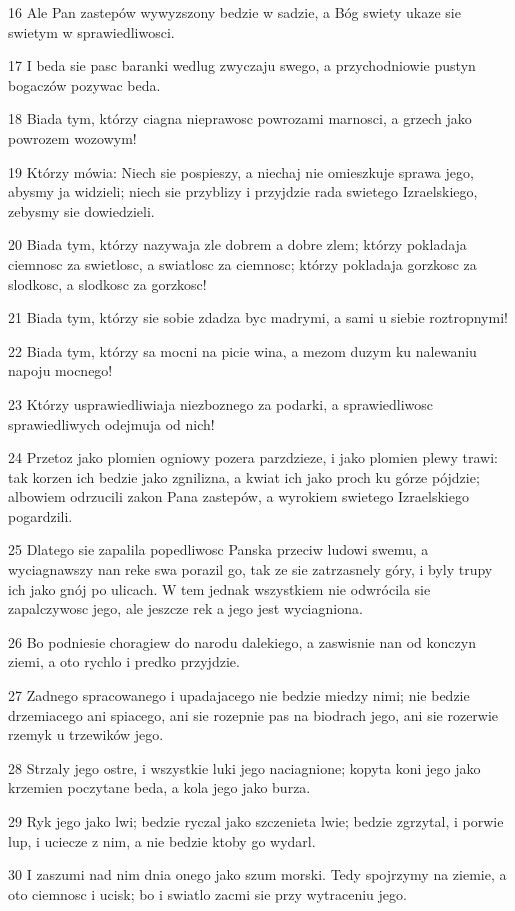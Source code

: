 \par 16 Ale Pan zastepów wywyzszony bedzie w sadzie, a Bóg swiety ukaze sie swietym w sprawiedliwosci.
\par 17 I beda sie pasc baranki wedlug zwyczaju swego, a przychodniowie pustyn bogaczów pozywac beda.
\par 18 Biada tym, którzy ciagna nieprawosc powrozami marnosci, a grzech jako powrozem wozowym!
\par 19 Którzy mówia: Niech sie pospieszy, a niechaj nie omieszkuje sprawa jego, abysmy ja widzieli; niech sie przyblizy i przyjdzie rada swietego Izraelskiego, zebysmy sie dowiedzieli.
\par 20 Biada tym, którzy nazywaja zle dobrem a dobre zlem; którzy pokladaja ciemnosc za swietlosc, a swiatlosc za ciemnosc; którzy pokladaja gorzkosc za slodkosc, a slodkosc za gorzkosc!
\par 21 Biada tym, którzy sie sobie zdadza byc madrymi, a sami u siebie roztropnymi!
\par 22 Biada tym, którzy sa mocni na picie wina, a mezom duzym ku nalewaniu napoju mocnego!
\par 23 Którzy usprawiedliwiaja niezboznego za podarki, a sprawiedliwosc sprawiedliwych odejmuja od nich!
\par 24 Przetoz jako plomien ogniowy pozera parzdzieze, i jako plomien plewy trawi: tak korzen ich bedzie jako zgnilizna, a kwiat ich jako proch ku górze pójdzie; albowiem odrzucili zakon Pana zastepów, a wyrokiem swietego Izraelskiego pogardzili.
\par 25 Dlatego sie zapalila popedliwosc Panska przeciw ludowi swemu, a wyciagnawszy nan reke swa porazil go, tak ze sie zatrzasnely góry, i byly trupy ich jako gnój po ulicach. W tem jednak wszystkiem nie odwrócila sie zapalczywosc jego, ale jeszcze rek a jego jest wyciagniona.
\par 26 Bo podniesie choragiew do narodu dalekiego, a zaswisnie nan od konczyn ziemi, a oto rychlo i predko przyjdzie.
\par 27 Zadnego spracowanego i upadajacego nie bedzie miedzy nimi; nie bedzie drzemiacego ani spiacego, ani sie rozepnie pas na biodrach jego, ani sie rozerwie rzemyk u trzewików jego.
\par 28 Strzaly jego ostre, i wszystkie luki jego naciagnione; kopyta koni jego jako krzemien poczytane beda, a kola jego jako burza.
\par 29 Ryk jego jako lwi; bedzie ryczal jako szczenieta lwie; bedzie zgrzytal, i porwie lup, i uciecze z nim, a nie bedzie ktoby go wydarl.
\par 30 I zaszumi nad nim dnia onego jako szum morski. Tedy spojrzymy na ziemie, a oto ciemnosc i ucisk; bo i swiatlo zacmi sie przy wytraceniu jego.


